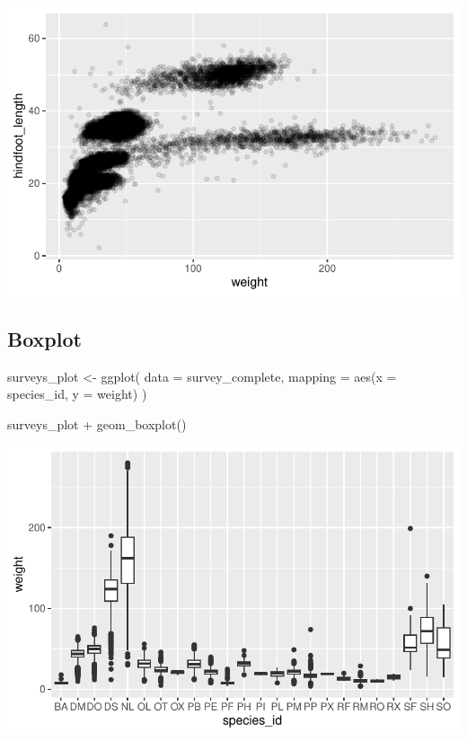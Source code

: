 \documentclass[
  letterpaper,
  DIV=11,
  numbers=noendperiod]{scrreprt}
\newenvironment{Shaded}{\begin{snugshade}}{\end{snugshade}}
\newcommand{\AttributeTok}[1]{\textcolor[rgb]{0.40,0.45,0.13}{#1}}
\newcommand{\FunctionTok}[1]{\textcolor[rgb]{0.28,0.35,0.67}{#1}}
\newcommand{\NormalTok}[1]{\textcolor[rgb]{0.00,0.23,0.31}{#1}}
\newcommand{\OtherTok}[1]{\textcolor[rgb]{0.00,0.23,0.31}{#1}}
\newcommand{\SpecialCharTok}[1]{\textcolor[rgb]{0.37,0.37,0.37}{#1}}
\begin{document}
\includegraphics{src/notebooks/r_files/figure-pdf/unnamed-chunk-46-5.pdf}

\subsection{Boxplot}\label{boxplot}

\begin{Shaded}
\begin{Highlighting}[]
\NormalTok{surveys\_plot }\OtherTok{\textless{}{-}} \FunctionTok{ggplot}\NormalTok{(}
  \AttributeTok{data =}\NormalTok{ survey\_complete,}
  \AttributeTok{mapping =} \FunctionTok{aes}\NormalTok{(}\AttributeTok{x =}\NormalTok{ species\_id, }\AttributeTok{y =}\NormalTok{ weight)}
\NormalTok{)}

\NormalTok{surveys\_plot }\SpecialCharTok{+} \FunctionTok{geom\_boxplot}\NormalTok{()}
\end{Highlighting}
\end{Shaded}

\includegraphics{src/notebooks/r_files/figure-pdf/unnamed-chunk-47-1.pdf}
\end{document}
